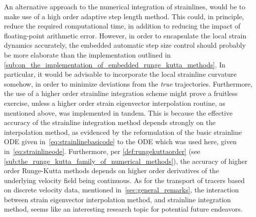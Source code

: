 %
An alternative approach to the numerical integration of strainlines, would be
to make use of a high order adaptive step length method. This could, in
principle, reduce the required computational time, in addition to reducing
the impact of floating-point arithmetic error. However, in order to encapsulate
the local strain dynamics accurately, the embedded automatic step size control
should probably be more elaborate than the implementation outlined in
\cref{sub:on_the_implementation_of_embedded_runge_kutta_methods}. In particular,
it would be advisable to incorporate the local strainline curvature somehow,
in order to minimize deviations from the \emph{true} trajectories. Furthermore,
the use of a higher order strainline integration scheme might prove a fruitless
exercise, unless a higher order strain eigenvector interpolation routine, as
mentioned above, was implemented in tandem. This is because the effective
accuracy of the strainline integration method depends strongly on the
interpolation method, as evidenced by the reformulation of the basic
strainline ODE given in~\cref{eq:strainlinebasicode} to the ODE which
was used here, given in~\cref{eq:strainlineode}. Furthermore, per
\cref{def:rungekuttaorder} (see
\cref{sub:the_runge_kutta_family_of_numerical_methods}), the accuracy of
higher order Runge-Kutta methods depends on higher order derivatives of the
underlying velocity field being continuous. As for the transport of tracers
based on discrete velocity data, mentioned in~\cref{sec:general_remarks}, the
interaction between strain eigenvector interpolation method, and strainline
integration method, seems like an interesting research topic for potential
future endeavors.

%
